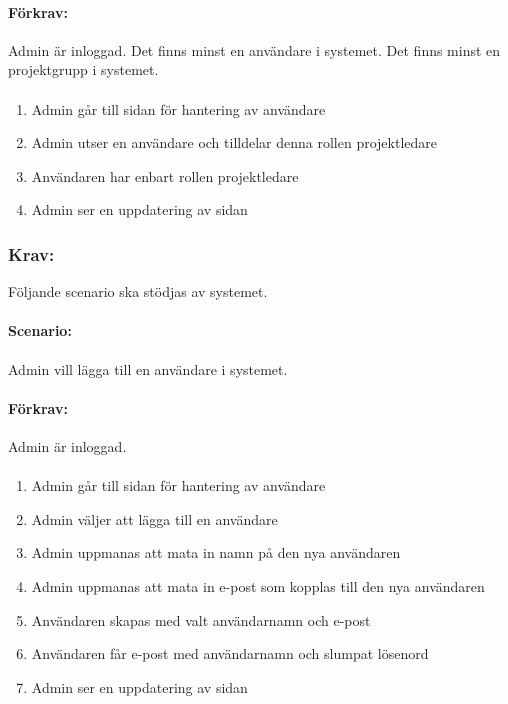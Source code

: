 \documentclass[paper=a4, fontsize=11pt,twoside]{article}
\begin{document}
	\paragraph{Förkrav:}
	Admin är inloggad. Det finns minst en användare i systemet. Det finns minst en projektgrupp i systemet.
	\paragraph{}
	\begin{enumerate}
		\item Admin går till sidan för hantering av användare
		\item Admin utser en användare och tilldelar denna rollen projektledare
		\item Användaren har enbart rollen projektledare
		\item Admin ser en uppdatering av sidan
	\end{enumerate}
	\newpage
	\subsubsection{Krav:} Följande scenario ska stödjas av systemet. 
	\paragraph{Scenario:}
	Admin vill lägga till en användare i systemet.
	\paragraph{Förkrav:}
	Admin är inloggad. 
	\paragraph{}
	\begin{enumerate}
		\item Admin går till sidan för hantering av användare
		\item Admin väljer att lägga till en användare
		\item Admin uppmanas att mata in namn på den nya användaren
		\item Admin uppmanas att mata in e-post som kopplas till den nya användaren
		\item Användaren skapas med valt användarnamn och e-post
		\item Användaren får e-post med användarnamn och slumpat lösenord
		\item Admin ser en uppdatering av sidan
	\end{enumerate}
	
\end{document}
